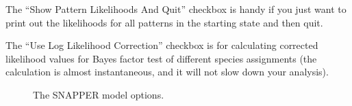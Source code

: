 {{    The ``Show Pattern Likelihoods And Quit'' checkbox is handy if you just want to print out the likelihoods for all patterns in the starting state and then quit.
    
    The ``Use Log Likelihood Correction'' checkbox is for calculating corrected likelihood values for Bayes factor test of different species assignments (the calculation is almost instantaneous, and it will not slow down your analysis).
        
    }
    
        \begin{figure}[htbp]
        \centering
        \caption{The SNAPPER model options.}
        \label{fig:beauti-mutation}
    \end{figure}
}

